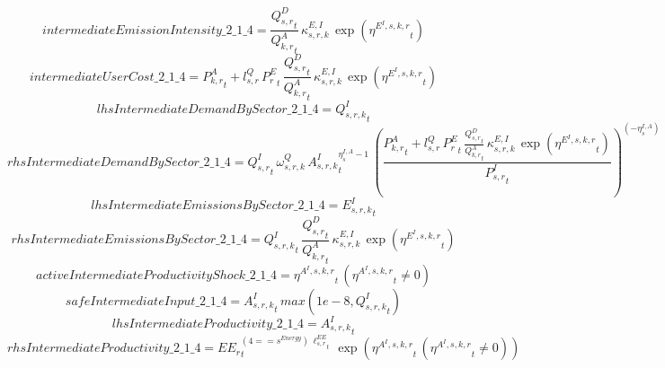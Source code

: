 \begin{dmath*}
intermediateEmissionIntensity\_2\_1\_4 = \frac{{{Q^{D}_{s,r}}}_{t}}{{{Q^{A}_{k,r}}}_{t}}\, {{\kappa^{E,I}_{s,r,k}}}\, \exp\left({{\eta^{E^{I},s,k,r}}}_{t}\right)
\end{dmath*}
\begin{dmath*}
intermediateUserCost\_2\_1\_4 = {{P^{A}_{k,r}}}_{t}+{{l^{Q}_{s,r}}}\, {{P^E_r}}_{t}\, \frac{{{Q^{D}_{s,r}}}_{t}}{{{Q^{A}_{k,r}}}_{t}}\, {{\kappa^{E,I}_{s,r,k}}}\, \exp\left({{\eta^{E^{I},s,k,r}}}_{t}\right)
\end{dmath*}
\begin{dmath*}
lhsIntermediateDemandBySector\_2\_1\_4 = {{Q^{I}_{s,r,k}}}_{t}
\end{dmath*}
\begin{dmath*}
rhsIntermediateDemandBySector\_2\_1\_4 = {{Q^{I}_{s,r}}}_{t}\, {{\omega^{Q}_{s,r,k}}}\, {{A^{I}_{s,r,k}}}_{t}^{{{\eta^{I,A}_{s}}}-1}\, \left(\frac{{{P^{A}_{k,r}}}_{t}+{{l^{Q}_{s,r}}}\, {{P^E_r}}_{t}\, \frac{{{Q^{D}_{s,r}}}_{t}}{{{Q^{A}_{k,r}}}_{t}}\, {{\kappa^{E,I}_{s,r,k}}}\, \exp\left({{\eta^{E^{I},s,k,r}}}_{t}\right)}{{{P^{I}_{s,r}}}_{t}}\right)^{\left(-{{\eta^{I,A}_{s}}}\right)}
\end{dmath*}
\begin{dmath*}
lhsIntermediateEmissionsBySector\_2\_1\_4 = {{E^I_{s,r,k}}}_{t}
\end{dmath*}
\begin{dmath*}
rhsIntermediateEmissionsBySector\_2\_1\_4 = {{Q^{I}_{s,r,k}}}_{t}\, \frac{{{Q^{D}_{s,r}}}_{t}}{{{Q^{A}_{k,r}}}_{t}}\, {{\kappa^{E,I}_{s,r,k}}}\, \exp\left({{\eta^{E^{I},s,k,r}}}_{t}\right)
\end{dmath*}
\begin{dmath*}
activeIntermediateProductivityShock\_2\_1\_4 = {{\eta^{A^{I},s,k,r}}}_{t}\, \left({{\eta^{A^{I},s,k,r}}}_{t}\neq 0\right)
\end{dmath*}
\begin{dmath*}
safeIntermediateInput\_2\_1\_4 = {{A^{I}_{s,r,k}}}_{t}\, max(1e-8,{{Q^{I}_{s,r,k}}}_{t})
\end{dmath*}
\begin{dmath*}
lhsIntermediateProductivity\_2\_1\_4 = {{A^{I}_{s,r,k}}}_{t}
\end{dmath*}
\begin{dmath*}
rhsIntermediateProductivity\_2\_1\_4 = {{EE_r}}_{t}^{\left(4=={{s^{Energy}}}\right)\, {{\ell^{EE}_{s,r}}}_{t}}\, \exp\left({{\eta^{A^{I},s,k,r}}}_{t}\, \left({{\eta^{A^{I},s,k,r}}}_{t}\neq 0\right)\right)
\end{dmath*}
